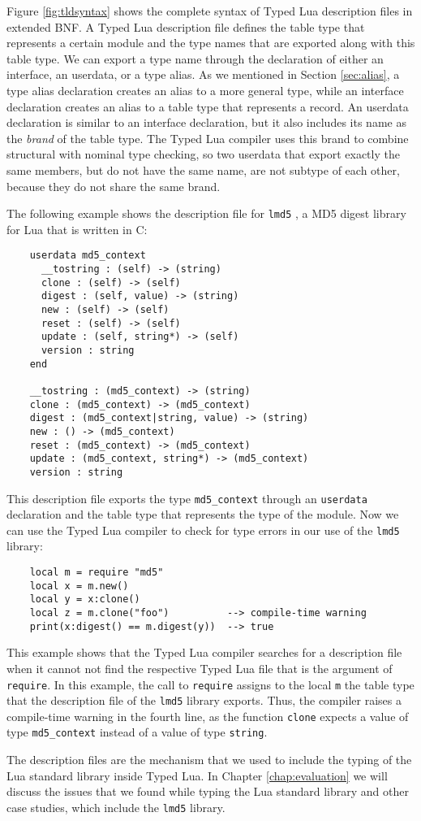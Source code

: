 Figure \ref{fig:tldsyntax} shows the complete syntax of Typed Lua
description files in extended BNF.
A Typed Lua description file defines the table type that represents
a certain module and the type names that are exported
along with this table type.
We can export a type name through the declaration of either an interface,
an userdata, or a type alias.
As we mentioned in Section \ref{sec:alias}, a type alias declaration
creates an alias to a more general type, while an interface declaration
creates an alias to a table type that represents a record.
An userdata declaration is similar to an interface declaration,
but it also includes its name as the \emph{brand} of the table type.
The Typed Lua compiler uses this brand to combine structural with
nominal type checking, so two userdata that export exactly the same members,
but do not have the same name, are not subtype of each other,
because they do not share the same brand.

The following example shows the description file for \texttt{lmd5} \citep{lmd5},
a MD5 digest library for Lua that is written in C:
\begin{verbatim}
    userdata md5_context
      __tostring : (self) -> (string)
      clone : (self) -> (self)
      digest : (self, value) -> (string)
      new : (self) -> (self)
      reset : (self) -> (self)
      update : (self, string*) -> (self)
      version : string
    end

    __tostring : (md5_context) -> (string)
    clone : (md5_context) -> (md5_context)
    digest : (md5_context|string, value) -> (string)
    new : () -> (md5_context)
    reset : (md5_context) -> (md5_context)
    update : (md5_context, string*) -> (md5_context)
    version : string
\end{verbatim}

This description file exports the type \texttt{md5\string_context}
through an \texttt{userdata} declaration and the table type that
represents the type of the module.
Now we can use the Typed Lua compiler to check for type errors in
our use of the \texttt{lmd5} library:
\begin{verbatim}
    local m = require "md5"
    local x = m.new()
    local y = x:clone()
    local z = m.clone("foo")          --> compile-time warning
    print(x:digest() == m.digest(y))  --> true
\end{verbatim}

This example shows that the Typed Lua compiler searches for a
description file when it cannot not find the respective Typed Lua file
that is the argument of \texttt{require}.
In this example, the call to \texttt{require} assigns to the local
\texttt{m} the table type that the description file of the \texttt{lmd5}
library exports. 
Thus, the compiler raises a compile-time warning in the fourth line,
as the function \texttt{clone} expects a value of type
\texttt{md5\string_context} instead of a value of type \texttt{string}.

The description files are the mechanism that we used to include the
typing of the Lua standard library inside Typed Lua.
In Chapter \ref{chap:evaluation} we will discuss the issues that we
found while typing the Lua standard library and other case studies,
which include the \texttt{lmd5} library. 

